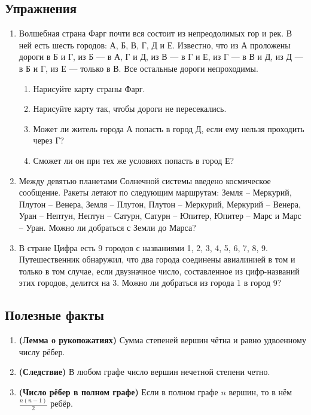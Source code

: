 \documentclass[a4paper,12pt]{article}
\begin{document}
\subsection*{Упражнения}
\begin{enumerate}
    \item Волшебная страна Фарг почти вся состоит из непреодолимых гор и рек. В ней есть шесть городов: А, Б, В, Г, Д и Е. Известно, что из А проложены дороги в Б и Г, из Б — в А, Г и Д, из В — в Г и Е, из Г — в В и Д, из Д — в Б и Г, из Е — только в В. Все остальные дороги непроходимы.
    \begin{enumerate}
        \item Нарисуйте карту страны Фарг.
        \item Нарисуйте карту так, чтобы дороги не пересекались.
        \item Может ли житель города А попасть в город Д, если ему нельзя проходить через Г?
        \item Сможет ли он при тех же условиях попасть в город Е?
    \end{enumerate}
    \item Между девятью планетами Солнечной системы введено космическое сообщение. Ракеты летают по следующим маршрутам: Земля – Меркурий, Плутон – Венера, Земля – Плутон, Плутон – Меркурий, Меркурий – Венера, Уран – Нептун, Нептун – Сатурн, Сатурн – Юпитер, Юпитер – Марс и Марс – Уран. Можно ли добраться с Земли до Марса?
    \item В стране Цифра есть 9 городов с названиями 1, 2, 3, 4, 5, 6, 7, 8, 9. Путешественник обнаружил, что два города соединены авиалинией в том и только в том случае, если двузначное число, составленное из цифр-названий этих городов, делится на 3. Можно ли добраться из города 1 в город 9?
\end{enumerate}

\subsection*{Полезные факты}
\begin{enumerate}
    \item \textbf{(Лемма о рукопожатиях)} Сумма степеней вершин чётна и равно удвоенному числу рёбер.
    \item \textbf{(Следствие)} В любом графе число вершин нечетной степени четно.
    \item \textbf{(Число рёбер в полном графе)} Если в полном графе $n$ вершин, то в нём $ \frac{n(n-1)}{2}$ ребёр.
\end{enumerate}
\end{document}
